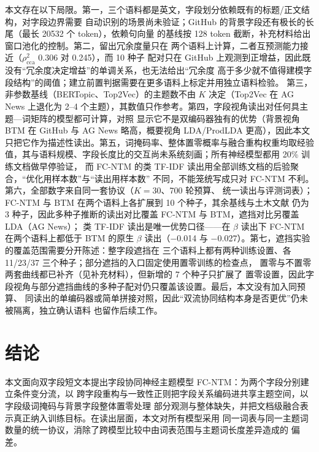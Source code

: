 \documentclass{article}
\begin{document}
本文存在以下局限。第一，三个语料都是英文，字段划分依赖既有的标题/正文结构，对字段边界需要
自动识别的场景尚未验证；GitHub 的背景字段还有极长的长尾（最长 20532 个 token），依赖句向量
的基线按 128 token 截断，补充材料给出窗口池化的控制。第二，留出冗余度量只在
两个语料上计算，二者互预测能力接近（$\rho^2_{\mathrm{cca}}$ 0.306 对 0.245），而 10 种子
配对只在 GitHub 上观测到正增益，因此既没有“冗余度决定增益”的单调关系，也无法给出“冗余度
高于多少就不值得建模字段结构”的阈值；建立前置判据需要在更多语料上标定并用独立语料检验。
第三，非参数基线（BERTopic、Top2Vec）的主题数不由 $K$ 决定（Top2Vec 在 AG News 上退化为
2--4 个主题），其数值只作参考。第四，字段视角读出对任何具主题—词矩阵的模型都可计算，对照
显示它不是双编码器独有的优势（背景视角 BTM 在 GitHub 与 AG News 略高，概要视角 LDA/ProdLDA
更高），因此本文只把它作为描述性读出。第五，词掩码率、整体置零概率与融合重构权重均取经验
值，其与语料规模、字段长度比的交互尚未系统刻画；所有神经模型都用 20\% 训练文档做早停验证，
而 FC-NTM 的类 TF-IDF 读出用全部训练文档的后验聚合，“优化用样本数”与“读出用样本数”
不同，不能笼统写成只对 FC-NTM 不利。第六，全部数字来自同一套协议（$K=30$、700 轮预算、
统一读出与评测词表）；FC-NTM 与 BTM 在两个语料上各扩展到 10 个种子，其余基线与土木文献
仍为 3 种子，因此多种子推断的读出对比覆盖 FC-NTM 与 BTM，遮挡对比另覆盖 LDA（AG News）；
类 TF-IDF 读出是唯一优势口径——在 $\beta$ 读出下 FC-NTM 在两个语料上都低于 BTM 的原生
$\beta$ 读出（$-$0.014 与 $-$0.027）。第七，遮挡实验的覆盖范围需要分开陈述：整字段遮挡在
三个语料上都有两种训练设置、各 11/23/37 三个种子；部分遮挡的入口固定使用置零训练的检查点，
置零与不置零两套曲线都已补齐（见补充材料），但新增的 7 个种子只扩展了
置零设置，因此字段视角与部分遮挡曲线的多种子配对仍只覆盖该设置。最后，本文没有加入同预算、
同读出的单编码器或简单拼接对照，因此“双流协同结构本身是否更优”仍未被隔离，独立确认语料
也留作后续工作。

\section{结论}

本文面向双字段短文本提出字段协同神经主题模型 FC-NTM：为两个字段分别建立条件变分流，以
跨字段重构与一致性正则把字段关系编码进共享主题空间，以字段级词掩码与背景字段整体置零处理
部分观测与整体缺失，并把文档级融合表示真正纳入训练目标。在读出层面，本文对所有模型采用
同一词表与同一主题词数量的统一协议，消除了跨模型比较中由词表范围与主题词长度差异造成的
偏差。
\end{document}
